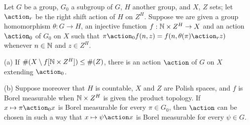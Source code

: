 
 Let $G$ be a group, $G_0$ a
subgroup of $G$, $H$ another group, and $X$, $Z$ sets;  let
$\action_r$ be the right shift action of $H$ on $Z^H$.
Suppose we are given a group homomorphism $\theta:G\to H$,
an injective function $f:\Bbb N\times Z^H\to X$
and an action $\action_0$ of $G_0$ on $X$ such that
$\pi\action_0f(n,z)=f(n,\theta(\pi)\action_rz)$ whenever
$n\in\Bbb N$ and $z\in Z^H$.

(a) If $\#(X\setminus f[\Bbb N\times Z^H])\le\#(Z)$, there is an
action $\action$ of $G$ on $X$ extending $\action_0$.

(b) Suppose moreover 
that $H$ is countable, $X$ and $Z$ are Polish spaces, and
$f$ is Borel measurable when $\Bbb N\times Z^H$ is given the product
topology.   If $x\mapsto\pi\action_0x$ is
Borel measurable for every $\pi\in G_0$, then $\action$ can be chosen in
such a way that $x\mapsto\psi\action x$ is Borel measurable
for every $\psi\in G$.

